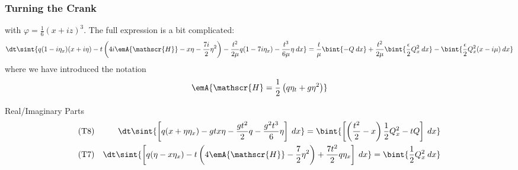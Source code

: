 
\begin{frame}[t]\frametitle{Turning the Crank}
     with $\varphi = \frac{1}{6}(x + iz)^3$. The full expression is a bit complicated:
    \tiny
    \begin{displaymath}
        \dt\sint{q(1-i\eta_x)(x + i \eta)-t\left(4i\emA{\mathscr{H}} - x\eta  -\frac{7i}{2}\eta^2\right) -\frac{t^2}{2\mu}q(1-7i\eta_x) - \frac{t^3}{6\mu}\eta\:dx}= \frac{t}{\mu}\bint{-Q\:dx} + \frac{t^2}{2\mu} \bint{\frac{\epsilon}{2}Q_x^2\:dx} - \bint{\frac{\epsilon}{2}Q_x^2(x-i\mu)\:dx}
    \end{displaymath}\normalsize
    where we have introduced the notation $$\emA{\mathscr{H} = \frac{1}{2}\left(q\eta_t + g\eta^2\right)}$$\pause
    \begin{block}{Real/Imaginary Parts}
        \vspace*{-.2in}
        \begin{eqnarray*}
        \text{(T8)} && \dt\sint{\left[q(x + \eta\eta_x)-gtx\eta - \frac{gt^2}{2}q - \frac{g^2t^3}{6}\eta\right]\:dx} = \bint{\left[\left(\frac{t^2}{2}-x\right)\frac{1}{2}Q_x^2-tQ\right]\:dx}\\
        \text{(T7)} &&\dt\sint{\left[ q(\eta - x\eta_x)-t\left(4\emA{\mathscr{H}} - \frac{7}{2}\eta^2\right) + \frac{7 t^2}{2}q\eta_x\right]\:dx}=\bint{\frac{1}{2}Q_x^2\:dx}
    \end{eqnarray*}
\end{block}
\end{frame}
